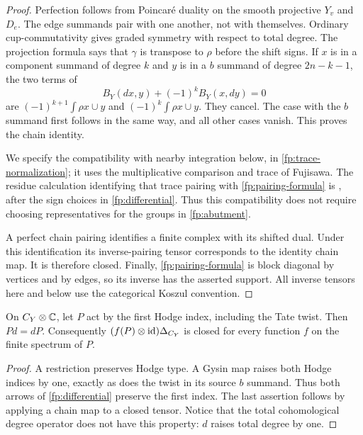 \begin{proof}
Perfection follows from Poincar\'e duality on the smooth projective $Y_v$ and
$D_e$.  The edge summands pair with one another, not with themselves.  Ordinary
cup-commutativity gives graded symmetry with respect to total degree.
The projection formula says that $\gamma$ is transpose to $\rho$ before the
shift signs.  If $x$ is in a component summand of degree $k$ and $y$ is in a
$b$ summand of degree $2n-k-1$, the two terms of
\begin{equation}\label{fp:chain-pairing}
 B_Y(dx,y)+(-1)^k B_Y(x,dy)=0
\end{equation}
are $(-1)^{k+1}\int \rho x\cup y$ and
$(-1)^k\int \rho x\cup y$.  They cancel.  The case with the $b$ summand
first follows in the same way, and all other cases vanish.  This proves the
chain identity.

We specify the compatibility with nearby integration below, in
\cref{fp:trace-normalization}; it uses the multiplicative comparison and
trace of Fujisawa.  The residue calculation identifying that trace pairing
with \eqref{fp:pairing-formula} is
\cite[Lemma~6.13 and proof of Theorem~8.11]{Fujisawa2014}, after the sign
choices in \eqref{fp:differential}.  Thus this compatibility does not require
choosing representatives for the groups in \eqref{fp:abutment}.

A perfect chain pairing identifies a finite complex with its shifted dual.
Under this identification its inverse-pairing tensor corresponds to the
identity chain map.  It is therefore closed.  Finally,
\eqref{fp:pairing-formula} is block diagonal by vertices and by edges, so its
inverse has the asserted support.  All inverse tensors here and below use
the categorical Koszul convention.
\end{proof}

\begin{lemma}\label{fp:first-index}
On $C_Y\otimes\mathbb C$, let $P$ act by the first Hodge index, including the Tate
twist.  Then $Pd=dP$.  Consequently $(f(P)\otimes\mathrm{id})\Delta_{C_Y}$ is closed
for every function $f$ on the finite spectrum of $P$.
\end{lemma}

\begin{proof}
A restriction preserves Hodge type.  A Gysin map raises both Hodge indices
by one, exactly as does the twist in its source $b$ summand.  Thus both arrows
of \eqref{fp:differential} preserve the first index.  The last assertion
follows by applying a chain map to a closed tensor.  Notice that the total
cohomological degree operator does not have this property: $d$ raises total
degree by one.
\end{proof}

